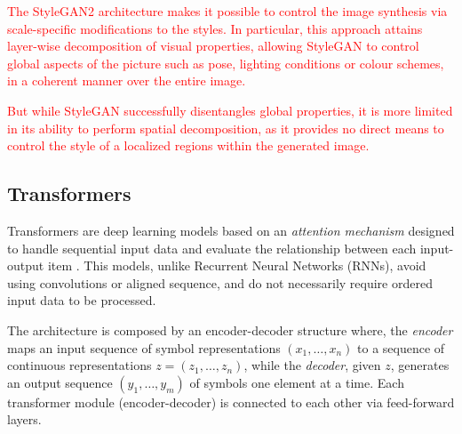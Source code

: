 \documentclass{article}
\begin{document}
	\textcolor{red}{
		The StyleGAN2 architecture makes it possible to control the image synthesis via scale-specific 
		modifications to the styles. In particular, this approach attains layer-wise decomposition of visual 
		properties, allowing StyleGAN to control global aspects of the picture such as pose, lighting 
		conditions or colour schemes, in a coherent manner over the entire image.}
	
	\textcolor{red}{
		But while StyleGAN successfully disentangles global properties, it is more limited in its ability to 
		perform spatial decomposition, as it provides no direct means to control the style of a localized 
		regions within the generated image.}
	
	
	\subsection{Transformers}%
	Transformers are deep learning models based on an \textit{attention mechanism} designed to handle 
	sequential input data and evaluate the relationship between each input-output item 
	\cite{vaswani2017attention}.
	This models, unlike Recurrent Neural Networks (RNNs), avoid using convolutions or aligned 
	sequence, and do not necessarily require ordered input data to be processed. 
	
	The architecture is composed by an encoder-decoder structure where, the \textit{encoder} maps an 
	input sequence of symbol representations $(x_1,\dots, x_n)$ to a sequence of continuous 
	representations $z = (z_1, \dots, z_n)$, while the  \textit{decoder}, given $z$, generates an 
	output sequence $(y_1, \dots, y_m)$ of symbols one element at a time. 
	Each transformer module (encoder-decoder) is connected to each other via feed-forward layers.
	
\end{document}
